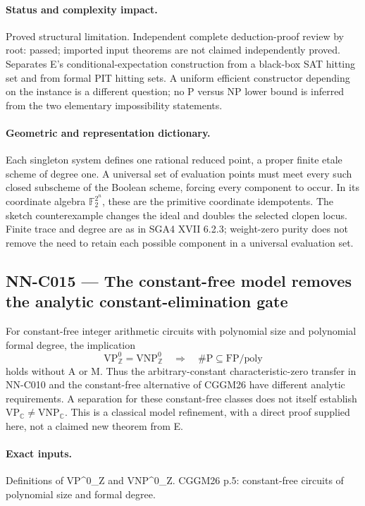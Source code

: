 \paragraph{Status and complexity impact.}
Proved structural limitation. Independent complete deduction-proof review by root: passed; imported input theorems are not claimed independently proved. Separates E's conditional-expectation construction from a black-box SAT hitting set and from formal PIT hitting sets. A uniform efficient constructor depending on the instance is a different question; no P versus NP lower bound is inferred from the two elementary impossibility statements.

\paragraph{Geometric and representation dictionary.}
Each singleton system defines one rational reduced point, a proper finite etale scheme of degree one. A universal set of evaluation points must meet every such closed subscheme of the Boolean scheme, forcing every component to occur. In its coordinate algebra $\mathbb F_2^{2^n}$, these are the primitive coordinate idempotents. The sketch counterexample changes the ideal and doubles the selected clopen locus. Finite trace and degree are as in SGA4 XVII 6.2.3; weight-zero purity does not remove the need to retain each possible component in a universal evaluation set.

\subsection{NN-C015 --- The constant-free model removes the analytic constant-elimination gate}
\begin{proposition}[NN-C015]
For constant-free integer arithmetic circuits with polynomial size and polynomial formal degree, the implication
\[
 \mathrm{VP}_{\mathbb Z}^{0}=\mathrm{VNP}_{\mathbb Z}^{0}
 \quad\Longrightarrow\quad \#\mathrm P\subseteq\mathrm{FP}/\mathrm{poly}
\]
holds without A or M. Thus the arbitrary-constant characteristic-zero transfer in NN-C010 and the constant-free alternative of CGGM26 have different analytic requirements. A separation for these constant-free classes does not itself establish $\mathrm{VP}_{\mathbb C}\ne\mathrm{VNP}_{\mathbb C}$. This is a classical model refinement, with a direct proof supplied here, not a claimed new theorem from E.
\end{proposition}
\paragraph{Exact inputs.}
Definitions of VP\textasciicircum{}0\_Z and VNP\textasciicircum{}0\_Z. CGGM26 p.5: constant-free circuits of polynomial size and formal degree.

